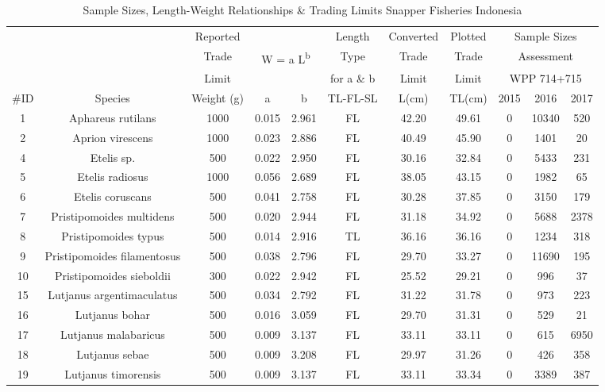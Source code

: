 \documentclass{report}\usepackage[]{graphicx}\usepackage[]{color}
\begin{document}
\begin{table}[ht]
\centering
\caption{Sample Sizes, Length-Weight Relationships \& Trading Limits Snapper Fisheries Indonesia} 
{\small
\begin{tabular}{ccccccccccc}
  \hline
  { } & { } & {Reported} & { } & { } & {Length} & {Converted} & {Plotted} & \multicolumn{3}{c}{Sample Sizes}\\
      { } & { } & {Trade} & \multicolumn{2}{c}{ W = a L\textsuperscript{b}} & {Type} & {Trade} & {Trade} & \multicolumn{3}{c}{Assessment}\\
      { } & { } & {Limit} & { } & { } & {for a \& b} & {Limit} & {Limit} & \multicolumn{3}{c}{WPP 714+715}\\
      {\#ID} & {Species} & {Weight (g)} & {a} & {b} & {TL-FL-SL} & {L(cm)} & {TL(cm)} & {2015} & {2016} & {2017}\\ \hline
1 & Aphareus rutilans & 1000 & 0.015 & 2.961 & FL & 42.20 & 49.61 & 0 & 10340 & 520 \\ 
  2 & Aprion virescens & 1000 & 0.023 & 2.886 & FL & 40.49 & 45.90 & 0 & 1401 & 20 \\ 
  4 & Etelis sp. & 500 & 0.022 & 2.950 & FL & 30.16 & 32.84 & 0 & 5433 & 231 \\ 
  5 & Etelis radiosus & 1000 & 0.056 & 2.689 & FL & 38.05 & 43.15 & 0 & 1982 & 65 \\ 
  6 & Etelis coruscans & 500 & 0.041 & 2.758 & FL & 30.28 & 37.85 & 0 & 3150 & 179 \\ 
  7 & Pristipomoides multidens & 500 & 0.020 & 2.944 & FL & 31.18 & 34.92 & 0 & 5688 & 2378 \\ 
  8 & Pristipomoides typus & 500 & 0.014 & 2.916 & TL & 36.16 & 36.16 & 0 & 1234 & 318 \\ 
  9 & Pristipomoides filamentosus & 500 & 0.038 & 2.796 & FL & 29.70 & 33.27 & 0 & 11690 & 195 \\ 
  10 & Pristipomoides sieboldii & 300 & 0.022 & 2.942 & FL & 25.52 & 29.21 & 0 & 996 & 37 \\ 
  15 & Lutjanus argentimaculatus & 500 & 0.034 & 2.792 & FL & 31.22 & 31.78 & 0 & 973 & 223 \\ 
  16 & Lutjanus bohar & 500 & 0.016 & 3.059 & FL & 29.70 & 31.31 & 0 & 529 & 21 \\ 
  17 & Lutjanus malabaricus & 500 & 0.009 & 3.137 & FL & 33.11 & 33.11 & 0 & 615 & 6950 \\ 
  18 & Lutjanus sebae & 500 & 0.009 & 3.208 & FL & 29.97 & 31.26 & 0 & 426 & 358 \\ 
  19 & Lutjanus timorensis & 500 & 0.009 & 3.137 & FL & 33.11 & 33.34 & 0 & 3389 & 387 \\ 

\end{tabular}}
\end{table}
\end{document}
